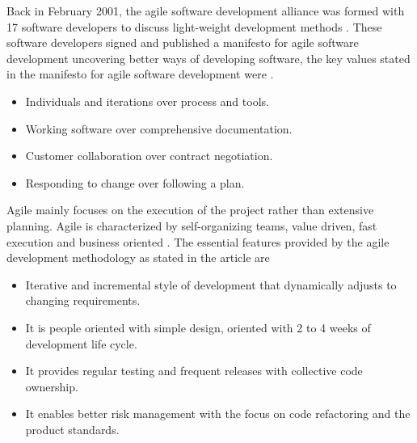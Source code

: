 \documentclass[a4paper,oneside]{bth}
\begin{document}
Back in February 2001, the agile software development alliance was formed with 17 software developers to discuss light-weight development methods \cite{fowler_agile_2001}. These software developers signed and published a manifesto for agile software development uncovering better ways of developing software, the key values stated in the manifesto for agile software development were \cite{fowler_agile_2001} \cite{al_tamimi_empirical_2014}.
\begin{itemize}
\item Individuals and iterations over process and tools.
\item Working software over comprehensive documentation.
\item Customer collaboration over contract negotiation.
\item Responding to change over following a plan.
\end{itemize}
Agile mainly focuses on the execution of the project rather than extensive planning\cite{al_tamimi_empirical_2014}. Agile is characterized by self-organizing teams, value driven, fast execution and business oriented \cite{al_tamimi_empirical_2014}. The essential features provided by the agile development methodology as stated in the article \cite{al_tamimi_empirical_2014} are
\begin{itemize}
\item Iterative and incremental style of development that dynamically adjusts to changing requirements.
\item It is people oriented with simple design, oriented with 2 to 4 weeks of development life cycle.
\item It provides regular testing and frequent releases with collective code ownership.
\item It enables better risk management with the focus on code refactoring and the product standards.
\end{itemize}
\end{document}
